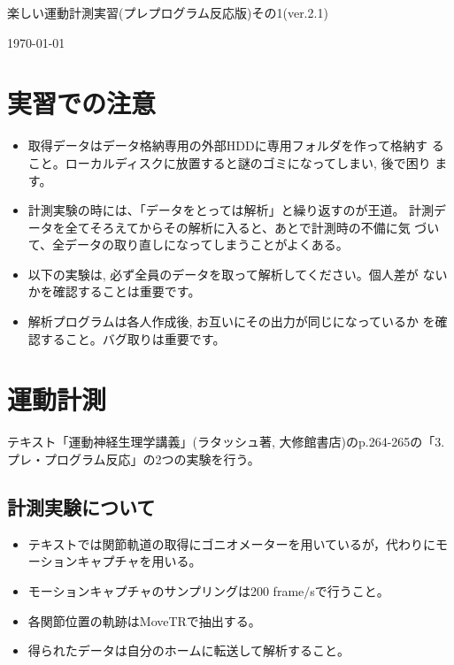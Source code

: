 \documentclass{jarticle}
\def\version{2.1}
\begin{document}
\begin{center}
  {\LARGE 楽しい運動計測実習(プレプログラム反応版)その1(ver.\version)}
\end{center}
\begin{flushright}
\today
\end{flushright}

\section*{実習での注意}
\begin{itemize}
\item 取得データはデータ格納専用の外部HDDに専用フォルダを作って格納す
  ること。ローカルディスクに放置すると謎のゴミになってしまい, 後で困り
  ます。
\item 計測実験の時には、「データをとっては解析」と繰り返すのが王道。
  計測データを全てそろえてからその解析に入ると、あとで計測時の不備に気
  づいて、全データの取り直しになってしまうことがよくある。
\item 以下の実験は, 必ず全員のデータを取って解析してください。個人差が
  ないかを確認することは重要です。
\item 解析プログラムは各人作成後, お互いにその出力が同じになっているか
  を確認すること。バグ取りは重要です。
\end{itemize}

\section{運動計測}
テキスト「運動神経生理学講義」(ラタッシュ著, 大修館書店)のp.264-265の「3.プレ・プログラム反応」の2つの実験を行う。

\subsection{計測実験について}
\begin{itemize}
\item テキストでは関節軌道の取得にゴニオメーターを用いているが，代わりにモーションキャプチャを用いる。
\item モーションキャプチャのサンプリングは200 frame$/$sで行うこと。
\item 各関節位置の軌跡はMoveTRで抽出する。
\item 得られたデータは自分のホームに転送して解析すること。
\end{itemize}
\end{document}
